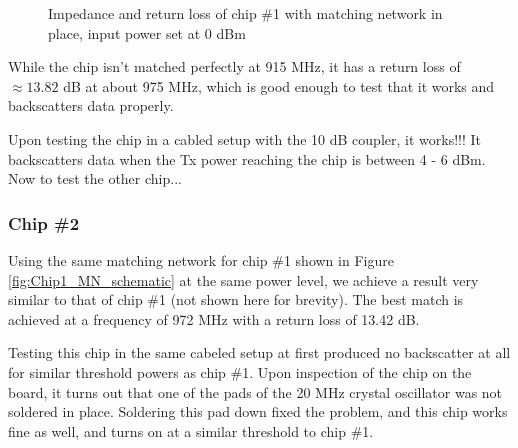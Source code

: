 \documentclass[12pt,onecolumn,titlepage]{article}
\begin{document}
\begin{figure}[htbp]
	\centering
		\quad
	\label{fig:Chip1_MN}
	\caption{Impedance and return loss of chip \#1 with matching network in place, input power set at 0 dBm}
\end{figure}

While the chip isn't matched perfectly at 915 MHz, it has a return loss of $\approx 13.82$ dB at about 975 MHz, which is good enough to test that it works and backscatters data properly.

Upon testing the chip in a cabled setup with the 10 dB coupler, it works!!! It backscatters data when the Tx power reaching the chip is between 4 - 6 dBm. Now to test the other chip...


\subsubsection{Chip \#2}
Using the same matching network for chip \#1 shown in Figure \ref{fig:Chip1_MN_schematic} at the same power level, we achieve a result very similar to that of chip \#1 (not shown here for brevity). The best match is achieved at a frequency of 972 MHz with a return loss of 13.42 dB. 

Testing this chip in the same cabeled setup at first produced no backscatter at all for similar threshold powers as chip \#1. Upon inspection of the chip on the board, it turns out that one of the pads of the 20 MHz crystal oscillator was not soldered in place. Soldering this pad down fixed the problem, and this chip works fine as well, and turns on at a similar threshold to chip \#1.
\end{document}

